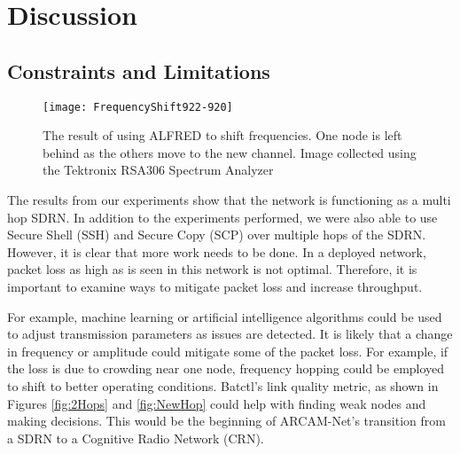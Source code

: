 
\chapter{Discussion} %

\label{Chapter5} %




\section{Constraints and Limitations}

\begin{figure}
	\centering
	\texttt{[image: FrequencyShift922-920]}
	\caption{The result of using ALFRED to shift frequencies. One node is left behind as the others move to the new channel. Image collected using the Tektronix RSA306 Spectrum Analyzer}
	\label{fig:freqshift}
\end{figure}


The results from our experiments show that the network is functioning as a multi hop SDRN. In addition to the experiments performed, we were also able to use Secure Shell (SSH) and Secure Copy (SCP) over multiple hops of the SDRN. However, it is clear that more work needs to be done. In a deployed network, packet loss as high as is seen in this network is not optimal. Therefore, it is important to examine ways to mitigate packet loss and increase throughput. 

For example, machine learning or artificial intelligence algorithms could be used to adjust transmission parameters as issues are detected. It is likely that a change in frequency or amplitude could mitigate some of the packet loss. For example, if the loss is due to crowding near one node, frequency hopping could be employed to shift to better operating conditions. Batctl's link quality metric, as shown in Figures \ref{fig:2Hops} and \ref{fig:NewHop} could help with finding weak nodes and making decisions. This would be the beginning of ARCAM-Net's transition from a SDRN to a Cognitive Radio Network (CRN). 

